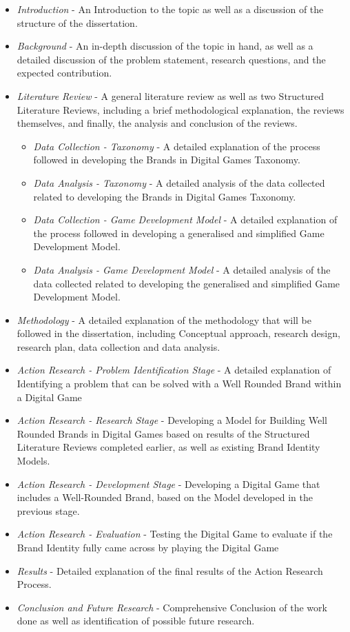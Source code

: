 \documentclass{article}
\begin{document}
\begin{itemize}
    \item \emph{Introduction} - An Introduction to the topic as well as a discussion of the structure of the dissertation.
    \item \emph{Background} - An in-depth discussion of the topic in hand, as well as a detailed discussion of the problem statement, research questions, and the expected contribution.
    \item \emph{Literature Review} - A general literature review as well as two Structured Literature Reviews, including a brief methodological explanation, the reviews themselves, and finally, the analysis and conclusion of the reviews.
    \begin{itemize}
    \item \emph{Data Collection - Taxonomy} - A detailed explanation of the process followed in developing the Brands in Digital Games Taxonomy.
    \item \emph{Data Analysis - Taxonomy} - A detailed analysis of the data collected related to developing the Brands in Digital Games Taxonomy.
    \item \emph{Data Collection - Game Development Model} - A detailed explanation of the process followed in developing a generalised and simplified Game Development Model.
    \item \emph{Data Analysis - Game Development Model} - A detailed analysis of the data collected related to developing the generalised and simplified Game Development Model.
    \end{itemize}
    \item \emph{Methodology} - A detailed explanation of the methodology that will be followed in the dissertation, including Conceptual approach, research design, research plan, data collection and data analysis.
    \item \emph{Action Research - Problem Identification Stage} - A detailed explanation of Identifying a problem that can be solved with a Well Rounded Brand within a Digital Game
    \item \emph{Action Research - Research Stage} - Developing a Model for Building Well Rounded Brands in Digital Games based on results of the Structured Literature Reviews completed earlier, as well as existing Brand Identity Models.
    \item \emph{Action Research - Development Stage} - Developing a Digital Game that includes a Well-Rounded Brand, based on the Model developed in the previous stage.
    \item \emph{Action Research - Evaluation} - Testing the Digital Game to evaluate if the Brand Identity fully came across by playing the Digital Game
    \item \emph{Results} - Detailed explanation of the final results of the Action Research Process.
    \item \emph{Conclusion and Future Research} - Comprehensive Conclusion of the work done as well as identification of possible future research.

\end{itemize}
\end{document}
